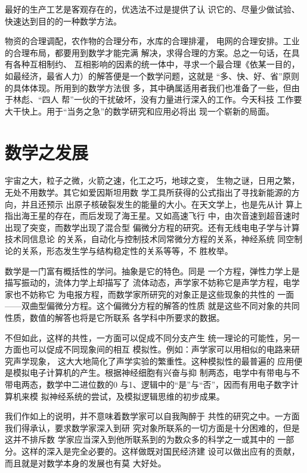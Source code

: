 \documentclass[twoside,openright,headings=optiontohead]{ctexbook} %
\begin{document}
{最好的生产工艺是客观存在的，优选法不过是提供了认
识它的、尽量少做试验、快速达到目的的一种数学方法。

物资的合理调配，农作物的合理分布，水库的合理排灌，
电网的合理安排。工业的合理布局，都要用到数学才能完满
解决，求得合理的方案。总之一句话，在具有各种互相制约、
互相影响的因素的统一体中，寻求一个最合理《依某一目的，
如最经济，最省人力）的解答便是一个数学问题，这就是
``多、快、好、省''原则的具体体现。所用到的数学方法很
多，其中确属适用者我们也准备了一些，但由于林彪、``四人
帮''一伙的干扰破坏，没有力量进行深入的工作。今天科技
工作要大干快上。用于``当务之急''的数学研究和应用必将出
现一个崭新的局面。

\section{数学之发展}\label{ux6570ux5b66ux4e4bux53d1ux5c55}

宇宙之大，粒子之微，火箭之速，化工之巧，地球之变，
生物之谜，日用之繁，无处不用数学。其它如爱因斯坦用数
学工具所获得的公式指出了寻找新能源的方向，并且还预示
出原子核破裂发生的能量的大小。在天文学上，也是先从计
算上指出海王星的存在，而后发现了海王星。又如高速飞行
中，由次音速到超音速时出现了突变，而数学出现了混合型
偏微分方程的研究。还有无线电电子学与计算技术同信息论
的关系，自动化与控制技术同常微分方程的关系，神经系统
同空制论的关系，形态发生学与结构稳定性的关系等等，不 胜枚举。

数学是一门富有概括性的学问。抽象是它的特色。同是
一个方程，弹性力学上是描写振动的，流体力学上却描写了
流体动态，声学家不妨称它是声学方程，电学家也不妨称它
为电报方程，而数学家所研究的对象正是这些现象的共性的
一面------双曲型偏微分方程。这个偏微分方程的解答的性质
就是这些不同对象的共同性质，数值的解答也将是它所联系
各学科中所要求的数据。

不但如此，这样的共性，一方面可以促成不同分支产生
统一理论的可能性，另一方面也可以促成不同现象间的相互
模拟性。例如：声学家可以用相似的电路来研究声学现象，
这大大地简化了声学实验的繁重性。这种模拟性的最普遍的
应用便是模拟电子计算机的产生。根据神经细胞有兴奋与抑
制两态，电学中有带电与不带电两态，数学中二进位数的0
与1、逻辑中的``是''与``否''，因而有用电子数字计算机来模
拟神经系统的尝试，及模拟逻辑思维的初步成果。

我们作如上的说明，并不意味着数学家可以自我陶醉于
共性的研究之中。一方面我们得承认，要求数学家深入到研
究对象所联系的一切方面是十分困难的，但是这并不排斥数
学家应当深入到他所联系到的为数众多的科学之一或其中的
一部分。这样的深入是完全必要的。这样做既对国民经济建
设可以做出应有的贡献，而且就是对数学本身的发展也有莫 大好处。

}
\end{document}
